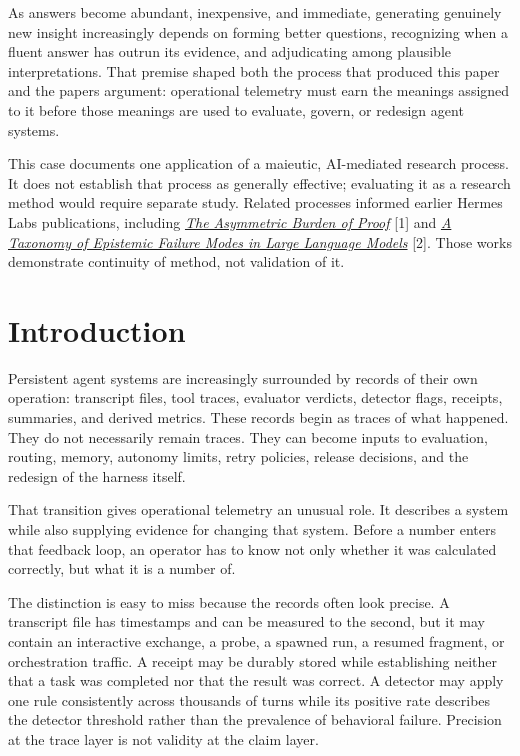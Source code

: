\documentclass[12pt]{article}
\renewenvironment{abstract}
  {\par\small\begin{center}\bfseries\abstractname\end{center}\vspace{-0.45em}}
  {\par\normalsize}
\begin{document}
\begin{abstract}
As answers become abundant, inexpensive, and immediate, generating genuinely new insight increasingly depends on forming better questions, recognizing when a fluent answer has outrun its evidence, and adjudicating among plausible interpretations. That premise shaped both the process that produced this paper and the paper\textquotesingle s argument: operational telemetry must earn the meanings assigned to it before those meanings are used to evaluate, govern, or redesign agent systems.

This case documents one application of a maieutic, AI-mediated research process. It does not establish that process as generally effective; evaluating it as a research method would require separate study. Related processes informed earlier Hermes Labs publications, including \href{https://doi.org/10.5281/zenodo.18867694}{\emph{The Asymmetric Burden of Proof}} {[}1{]} and \href{https://doi.org/10.5281/zenodo.19042469}{\emph{A Taxonomy of Epistemic Failure Modes in Large Language Models}} {[}2{]}. Those works demonstrate continuity of method, not validation of it.
\end{abstract}

\vspace{0.75em}

\section{Introduction}\label{introduction}

Persistent agent systems are increasingly surrounded by records of their own operation: transcript files, tool traces, evaluator verdicts, detector flags, receipts, summaries, and derived metrics. These records begin as traces of what happened. They do not necessarily remain traces. They can become inputs to evaluation, routing, memory, autonomy limits, retry policies, release decisions, and the redesign of the harness itself.

That transition gives operational telemetry an unusual role. It describes a system while also supplying evidence for changing that system. Before a number enters that feedback loop, an operator has to know not only whether it was calculated correctly, but what it is a number of.

The distinction is easy to miss because the records often look precise. A transcript file has timestamps and can be measured to the second, but it may contain an interactive exchange, a probe, a spawned run, a resumed fragment, or orchestration traffic. A receipt may be durably stored while establishing neither that a task was completed nor that the result was correct. A detector may apply one rule consistently across thousands of turns while its positive rate describes the detector threshold rather than the prevalence of behavioral failure. Precision at the trace layer is not validity at the claim layer.
\end{document}
